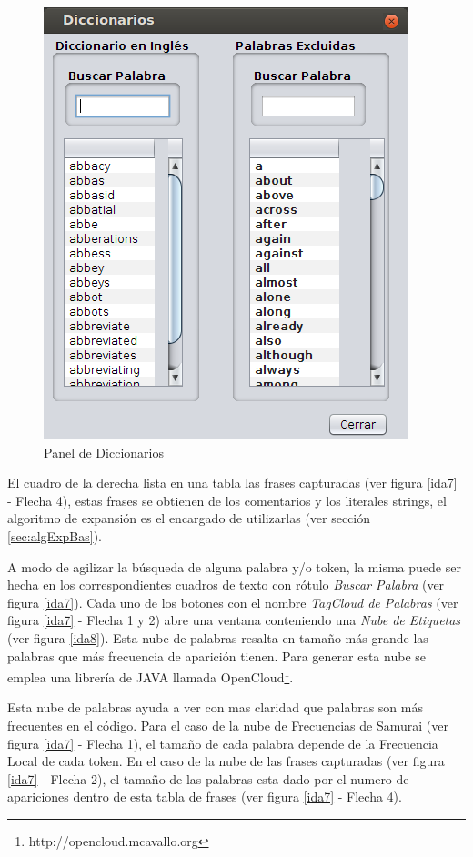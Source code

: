 \documentclass[a4paper,12pt]{report}
\begin{document}
\begin{figure}[t] %
\centerline{%
\includegraphics[scale= 0.6]{./ida_09.png}
}
\caption{Panel de Diccionarios}
\label{ida9}
\end{figure}

El cuadro de la derecha lista en una tabla las frases capturadas (ver figura \ref{ida7} - Flecha 4), estas frases se obtienen de los comentarios y los literales strings, el algoritmo de expansión es el encargado de utilizarlas (ver sección \ref{sec:algExpBas}).

A modo de agilizar la búsqueda de alguna palabra y/o token, la misma puede ser hecha en los correspondientes cuadros de texto con rótulo \textit{Buscar Palabra} (ver figura \ref{ida7}).
Cada uno de los botones con el nombre \textit{TagCloud de Palabras} (ver figura \ref{ida7} - Flecha 1 y 2) abre una ventana conteniendo una \textit{Nube de Etiquetas} (ver figura \ref{ida8}). Esta nube de palabras resalta en tamaño más grande las palabras que más frecuencia de aparición tienen. Para generar esta nube se emplea una librería de JAVA llamada OpenCloud\footnote[2]{http://opencloud.mcavallo.org}.

Esta nube de palabras ayuda a ver con mas claridad que palabras son más frecuentes en el código. Para el caso de la nube de Frecuencias de Samurai (ver figura \ref{ida7} - Flecha 1), el tamaño de cada palabra depende de la Frecuencia Local de cada token. En el caso de la nube de las frases capturadas (ver figura \ref{ida7} - Flecha 2), el tamaño de las palabras esta dado por el numero de apariciones dentro de esta tabla de frases (ver figura \ref{ida7} - Flecha 4).
\end{document}
